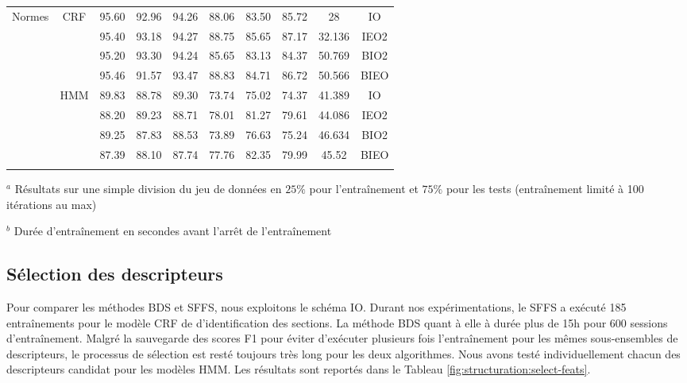 \begin{table}[h]
\begin{center}
\begin{tabular}{p{0.9cm}|c|cccccccc}
\multirow{8}{*}{Normes}  & \multirow{4}{*}{CRF} & 95.60 & 92.96 & 94.26 & 88.06 & 83.50 & 85.72 & 28 & IO \\%
&  & 95.40 & 93.18 & 94.27 & 88.75 & 85.65 & 87.17 & 32.136 & IEO2 \\
 &  & 95.20 & 93.30 & 94.24 & 85.65 & 83.13 & 84.37 & 50.769 & BIO2 \\
  &  & 95.46 & 91.57 & 93.47 & 88.83 & 84.71 & 86.72 & 50.566 & BIEO \\ \cline{2-10}
  & \multirow{4}{*}{HMM} & 89.83 & 88.78 & 89.30 & 73.74 & 75.02 & 74.37 &  41.389 & IO \\%
   &  & 88.20 & 89.23 & 88.71 & 78.01 & 81.27 & 79.61 & 44.086 & IEO2 \\
  &  & 89.25 & 87.83 & 88.53 & 73.89 & 76.63 & 75.24 & 46.634 & BIO2 \\
  &  & 87.39 & 88.10 & 87.74 & 77.76 & 82.35 & 79.99 & 45.52& BIEO \\ 
\noalign{\smallskip}\hline\noalign{\smallskip}
\end{tabular}
\end{center}

$^a$ Résultats sur une simple division du jeu de données en $25\%$ pour l'entraînement et  $75\%$ pour les tests (entraînement limité à 100 itérations au max)

$^b$ Durée d'entraînement en secondes avant l'arrêt de l'entraînement
\end{table}


\subsection{Sélection des descripteurs}
Pour comparer les méthodes BDS et SFFS, nous exploitons le schéma IO. Durant nos expérimentations, le SFFS a exécuté 185 entraînements pour le modèle CRF de d'identification des sections. La méthode BDS quant à elle à durée plus de 15h pour 600 sessions d'entraînement. Malgré la sauvegarde des scores F1 pour éviter d'exécuter plusieurs fois l'entraînement pour les mêmes sous-ensembles de descripteurs, le processus de sélection est resté toujours très long pour les deux algorithmes. Nous avons testé individuellement chacun des descripteurs candidat pour les modèles HMM. Les résultats sont reportés dans le Tableau \ref{fig:structuration:select-feats}.

